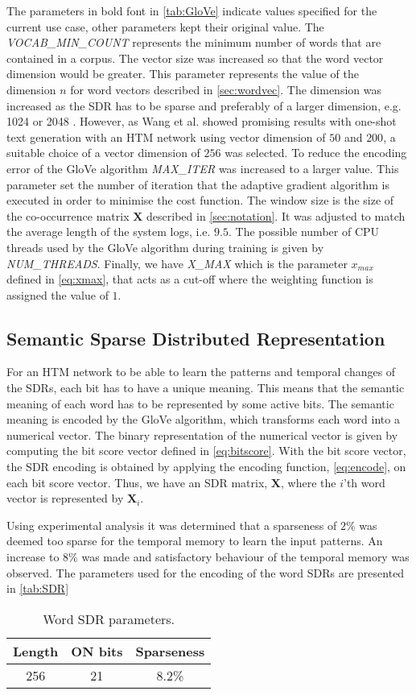 The parameters in bold font in \autoref{tab:GloVe} indicate values specified for the current use case, other parameters kept their original value. The \textit{VOCAB\_MIN\_COUNT} represents the minimum number of words that are contained in a corpus. The vector size was increased so that the word vector dimension would be greater. This parameter represents the value of the dimension $n$ for word vectors described in \autoref{sec:wordvec}. The dimension was increased as the SDR has to be sparse and preferably of a larger dimension, e.g. 1024 or 2048 \cite{DBLP:journals/corr/Purdy16}. However, as Wang et al. \cite{7844355} showed promising results with one-shot text generation with an HTM network using vector dimension of $50$ and $200$, a suitable choice of a vector dimension of $256$ was selected. To reduce the encoding error of the GloVe algorithm \textit{MAX\_ITER} was increased to a larger value. This parameter set the number of iteration that the adaptive gradient algorithm is executed in order to minimise the cost function. The window size is the size of the co-occurrence matrix $\boldsymbol{X}$ described in \autoref{sec:notation}. It was adjusted to match the average length of the system logs, i.e. $9.5$. The possible number of CPU threads used by the GloVe algorithm during training is given by \textit{NUM\_THREADS}. Finally, we have \textit{X\_MAX} which is the parameter $x_{max}$ defined in \autoref{eq:xmax}, that acts as a cut-off where the weighting function is assigned the value of $1$.


\subsection{Semantic Sparse Distributed Representation}
For an HTM network to be able to learn the patterns and temporal changes of the SDRs, each bit has to have a unique meaning. This means that the semantic meaning of each word has to be represented by some active bits. The semantic meaning is encoded by the GloVe algorithm, which transforms each word into a numerical vector. The binary representation of the numerical vector is given by computing the bit score vector defined in \autoref{eq:bitscore}. With the bit score vector, the SDR encoding is obtained by applying the encoding function, \autoref{eq:encode}, on each bit score vector. Thus, we have an SDR matrix, $\boldsymbol{X}$, where the $i$'th word vector is represented by $\boldsymbol{X}_i$. 

Using experimental analysis it was determined that a sparseness of $2\%$ was deemed too sparse for the temporal memory to learn the input patterns. An increase to $8\%$ was made and satisfactory behaviour of the temporal memory was observed. The parameters used for the encoding of the word SDRs are presented in \autoref{tab:SDR}


\begin{table}[H]
\centering
\caption{Word SDR parameters.}
\label{tab:SDR}
\begin{tabularx}{10cm}{c c c}
\toprule
Length & \hspace{2.1cm} ON bits & \hspace{2.1cm} Sparseness\\
\midrule
        256 & \hspace{2.1cm} 21 & \hspace{2.1cm} 8.2\%\\
\bottomrule
\end{tabularx}
\end{table}